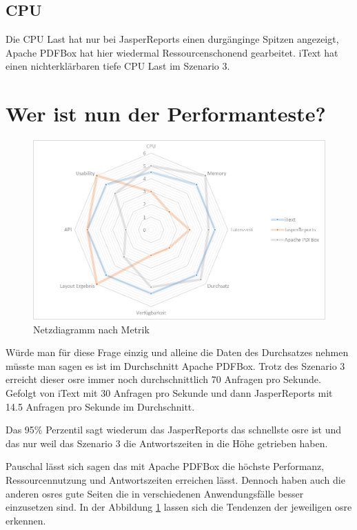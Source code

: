 \documentclass[main.tex]{subfiles}
\begin{document}
\subsection{CPU}
Die CPU Last hat nur bei JasperReports einen durgänginge Spitzen angezeigt, Apache PDFBox hat hier wiedermal Ressourcenschonend gearbeitet. iText hat einen nichterklärbaren tiefe CPU Last im Szenario 3.  


\section{Wer ist nun der Performanteste?}

\begin{figure}[!hb]
\includegraphics[width=\textwidth]{end/5_erfarhungsbericht/Netzdiagramm.png}
 \caption{Netzdiagramm nach Metrik}
 \label{figure:netzdiagrammMetriken}
\end{figure}

Würde man für diese Frage einzig und alleine die Daten des Durchsatzes nehmen müsste man sagen es ist im Durchschnitt Apache PDFBox. Trotz des Szenario 3 erreicht dieser \acrlong{osre} immer noch durchschnittlich 70 Anfragen pro Sekunde. Gefolgt von iText mit 30 Anfragen pro Sekunde und dann JasperReports mit 14.5 Anfragen pro Sekunde im Durchschnitt. 

Das 95\% Perzentil sagt wiederum das JasperReports das schnellste \acrlong{osre} ist und das nur weil das Szenario 3 die Antwortszeiten in die Höhe getrieben haben.

Pauschal lässt sich sagen das mit Apache PDFBox die höchste Performanz, Ressourcennutzung und Antwortszeiten erreichen lässt. Dennoch haben auch die anderen \acrlong{osre}s gute Seiten die in verschiedenen Anwendungsfälle besser einzusetzen sind. In der Abbildung \ref{figure:netzdiagrammMetriken} lassen sich die Tendenzen der jeweiligen \acrlong{osre} erkennen. 
\end{document}
